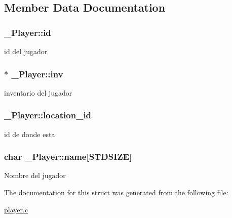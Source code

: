 \subsection{Member Data Documentation}
\hypertarget{struct__Player_a60d635cd063816a9c1bd873f4868bb90}{
\subsubsection[{id}]{ \+\_\+\+Player\+::id}}\label{struct__Player_a60d635cd063816a9c1bd873f4868bb90}
id del jugador \hypertarget{struct__Player_aaaeeb03326c37ce62c333c2b94fde23c}{
\subsubsection[{inv}]{$\ast$ \+\_\+\+Player\+::inv}}\label{struct__Player_aaaeeb03326c37ce62c333c2b94fde23c}
inventario del jugador \hypertarget{struct__Player_aca2cb83e7a18dea36c33ad94e36a1e54}{
\subsubsection[{location\+\_\+id}]{ \+\_\+\+Player\+::location\+\_\+id}}\label{struct__Player_aca2cb83e7a18dea36c33ad94e36a1e54}
id de donde esta \hypertarget{struct__Player_abd3fbad9568ff1e608654d58e71b8c58}{
\subsubsection[{name}]{\setlength{\rightskip}{0pt plus 5cm}char \+\_\+\+Player\+::name\mbox{[}{\bf S\+T\+D\+S\+I\+Z\+E}\mbox{]}}}\label{struct__Player_abd3fbad9568ff1e608654d58e71b8c58}
Nombre del jugador 

The documentation for this struct was generated from the following file\+:\begin{DoxyCompactItemize}
\item 
\hyperlink{player_8c}{player.\+c}\end{DoxyCompactItemize}
